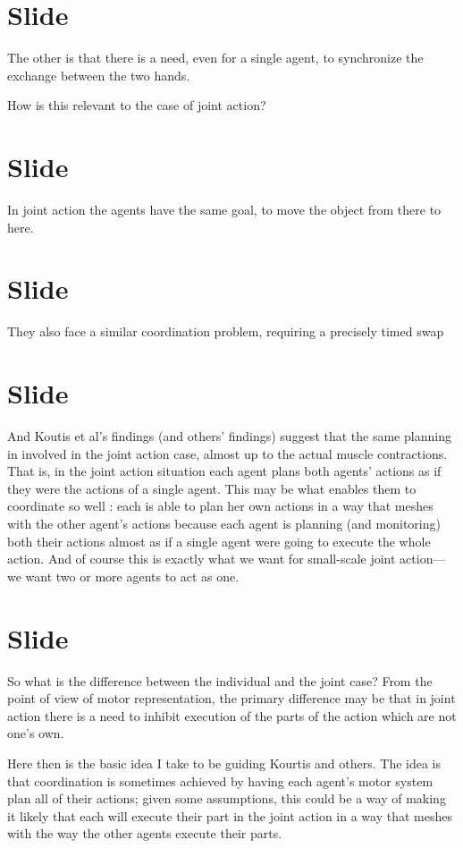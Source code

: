 \documentclass[12pt,\papersize]{extarticle}
\begin{document}
\section{Slide}
The other is that there is a need, even for a single agent, to synchronize the exchange between the two hands.

How is this relevant to the case of joint action?



\section{Slide}
In joint action the agents have the same goal, to move the object from there to here.



\section{Slide}
They also face a similar coordination problem, requiring a precisely timed swap



\section{Slide}
And Koutis et al’s findings (and others’ findings) suggest that the same planning in involved in the joint action case, almost up to the actual muscle contractions.
That is, in the joint action situation each agent plans both agents’ actions as if they were the actions of a single agent.
This may be what enables them to coordinate so well : each is able to plan her own actions in a way that meshes with the other agent’s actions because each agent is planning (and monitoring) both their actions almost as if a single agent were going to execute the whole action.
And of course this is exactly what we want for small-scale joint action---we want two or more agents to act as one.



\section{Slide}
So what is the difference between the individual and the joint case?  From the point of view of motor representation, the primary difference may be that in joint action there is a need to inhibit execution of the parts of the action which are not one’s own.

Here then is the basic idea I take to be guiding Kourtis and others.
The idea is that coordination is sometimes achieved by having each agent’s motor system plan all of their actions; 
given some assumptions, this could be a way of making it likely that each will execute their part in the joint action in a way that meshes with the way the other agents execute their parts.
\end{document}
